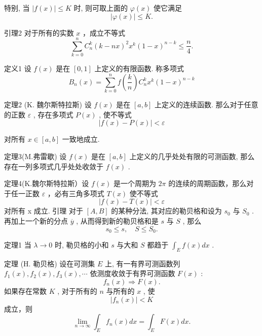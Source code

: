 \documentclass[]{article}
\begin{document}
特别, 当 $|f(x)| \leqslant K$ 时, 则可取上面的 $\varphi(x)$ 使它满足$$
| \varphi (x) | \leqslant K.
$$

引理2 对于所有的实数 $x$ ，成立不等式 $$
\sum_ {k = 0} ^ {n} C _ {n} ^ {k} (k - n x) ^ {2} x ^ {k} (1 - x) ^ {n - k} \leqslant \frac {n}{4}. 
$$

定义1 设 $f(x)$ 是在 $[0,1]$ 上定义的有限函数. 称多项式 $$
B _ {n} (x) = \sum_ {k = 0} ^ {n} f \left(\frac {k}{n}\right) C _ {n} ^ {k} x ^ {k} (1 - x) ^ {n - k} 
$$

定理2 (K. 魏尔斯特拉斯) 设 $f(x)$ 是在 $[a, b]$ 上定义的连续函数. 那么对于任意的正数 $\varepsilon$ , 存在多项式 $P(x)$ , 使不等式 $$
| f (x) - P (x) | <   \varepsilon
$$

对所有 $x \in [a, b]$ 一致地成立. 

定理3(M.弗雷歇) 设 $f(x)$ 是在 $[a,b]$ 上定义的几乎处处有限的可测函数, 那么存在一列多项式几乎处处收敛于 $f(x)$ . 

定理4(K.魏尔斯特拉斯）设 $f(x)$ 是一个周期为 $2\pi$ 的连续的周期函数，那么对于任一正数 $\varepsilon$ ，必有三角多项式 $T(x)$ 使不等式 $$
| f (x) - T (x) | <   \varepsilon
$$ 对所有 x 成立. 
引理 对于 $[A, B]$ 的某种分法, 其对应的勒贝格和设为 $s_0$ 与 $S_0$ . 再加上一个新的分点 $\overline{y}$ , 从而得到新的勒贝格和是 $s$ 与 $S$ , 那么$$
s _ {0} \leqslant s, \quad S \leqslant S _ {0}.
$$

定理1 当 $\lambda \to 0$ 时, 勒贝格的小和 $s$ 与大和 $S$ 都趋于 $\int_{E} f(x) dx$ . 

定理 (H. 勒贝格) 设在可测集 $E$ 上, 有一有界可测函数列 $f_{1}(x), f_{2}(x), f_{3}(x), \cdots$ 依测度收敛于有界可测函数 $F(x)$ : $$
f _ {n} (x) \Longrightarrow F (x).
$$ 如果存在常数 $K$ , 对于所有的 $n$ 与所有的 $x$ , 使$$
\left| f _ {n} (x) \right| <   K
$$ 成立，则$$
\lim _ {n \rightarrow \infty} \int_ {E} f _ {n} (x) d x = \int_ {E} F (x) d x.
$$

 











	
\end{document}
